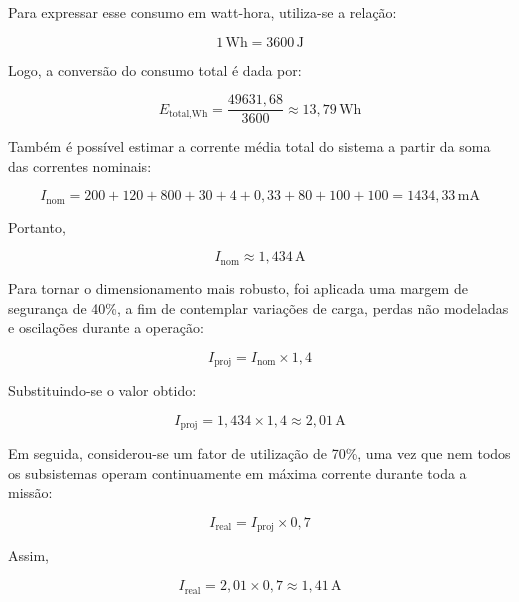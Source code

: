 Para expressar esse consumo em watt-hora, utiliza-se a relação:

\begin{equation}
1\,\mathrm{Wh} = 3600\,\mathrm{J}
\end{equation}

Logo, a conversão do consumo total é dada por:

\begin{equation}
E_{\text{total,Wh}}
=
\frac{49631{,}68}{3600}
\approx
13{,}79\,\mathrm{Wh}
\end{equation}

Também é possível estimar a corrente média total do sistema a partir da soma das correntes nominais:

\begin{equation}
I_{\text{nom}}
=
200 + 120 + 800 + 30 + 4 + 0{,}33 + 80 + 100 + 100
=
1434{,}33\,\mathrm{mA}
\end{equation}

Portanto,

\begin{equation}
I_{\text{nom}}
\approx
1{,}434\,\mathrm{A}
\end{equation}

Para tornar o dimensionamento mais robusto, foi aplicada uma margem de segurança de 40\%, a fim de contemplar variações de carga, perdas não modeladas e oscilações durante a operação:

\begin{equation}
I_{\text{proj}}
=
I_{\text{nom}} \times 1{,}4
\end{equation}

Substituindo-se o valor obtido:

\begin{equation}
I_{\text{proj}}
=
1{,}434 \times 1{,}4
\approx
2{,}01\,\mathrm{A}
\end{equation}

Em seguida, considerou-se um fator de utilização de 70\%, uma vez que nem todos os subsistemas operam continuamente em máxima corrente durante toda a missão:

\begin{equation}
I_{\text{real}}
=
I_{\text{proj}} \times 0{,}7
\end{equation}

Assim,

\begin{equation}
I_{\text{real}}
=
2{,}01 \times 0{,}7
\approx
1{,}41\,\mathrm{A}
\end{equation}

